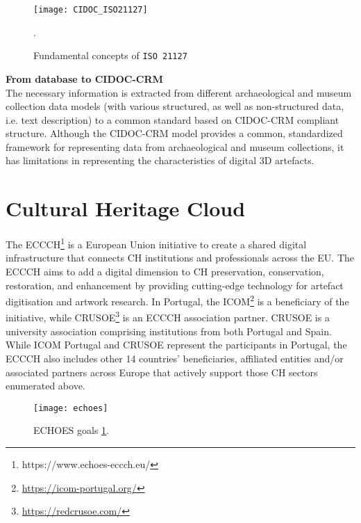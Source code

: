 \begin{figure}[h!]
    \centering
    \texttt{[image: CIDOC\_ISO21127]}
    \caption{Fundamental concepts of \texttt{ISO 21127}~\cite{doerr2007cidoc}}.
    \label{fig:cidoc}
\end{figure}
\FloatBarrier

\newpage

\noindent \textbf{From database to \gls{CIDOC-CRM}} \\
The necessary information is extracted from different archaeological and museum collection data models (with various structured, as well as non-structured
data, i.e. text description) to a common standard based on \gls{CIDOC-CRM} compliant structure.
Although the \gls{CIDOC-CRM} model provides a common, standardized framework for representing data from archaeological and museum collections, it has limitations in representing the characteristics of digital \gls{3D} artefacts.



\section{Cultural Heritage Cloud}
\label{sec:ch_cloud}

The \gls{ECCCH}\footnote{\label{myfootnote}https://www.echoes-eccch.eu/}   is a European Union initiative 
to create a shared digital infrastructure that connects \gls{CH} institutions and professionals across the \gls{EU}.
The \gls{ECCCH} aims to add a digital dimension to \gls{CH} preservation, conservation, restoration, and enhancement 
by providing cutting-edge technology for artefact digitisation and artwork research. 
In Portugal, the \gls{ICOM}\footnote{\url{https://icom-portugal.org/}} is a beneficiary of the initiative, while \gls{CRUSOE}\footnote{\url{https://redcrusoe.com/}} is an \gls{ECCCH} association partner. \gls{CRUSOE} is a university association comprising institutions from both Portugal and Spain.
While \gls{ICOM} Portugal and \gls{CRUSOE} represent the participants in Portugal, the \gls{ECCCH} also includes other 14 countries' beneficiaries, affiliated entities and/or associated partners across Europe that actively support those \gls{CH} sectors enumerated above.


\begin{figure}[h!]
    \centering
    \texttt{[image: echoes]}
    \caption{\gls{ECHOES} goals \ref{myfootnote}.} 
    \label{fig:echoes}
\end{figure}
\FloatBarrier

